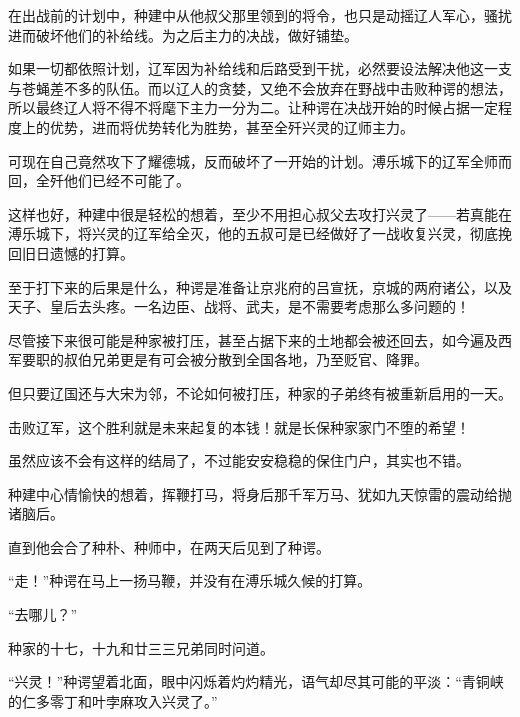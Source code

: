 在出战前的计划中，种建中从他叔父那里领到的将令，也只是动摇辽人军心，骚扰进而破坏他们的补给线。为之后主力的决战，做好铺垫。

如果一切都依照计划，辽军因为补给线和后路受到干扰，必然要设法解决他这一支与苍蝇差不多的队伍。而以辽人的贪婪，又绝不会放弃在野战中击败种谔的想法，所以最终辽人将不得不将麾下主力一分为二。让种谔在决战开始的时候占据一定程度上的优势，进而将优势转化为胜势，甚至全歼兴灵的辽师主力。

可现在自己竟然攻下了耀德城，反而破坏了一开始的计划。溥乐城下的辽军全师而回，全歼他们已经不可能了。

这样也好，种建中很是轻松的想着，至少不用担心叔父去攻打兴灵了——若真能在溥乐城下，将兴灵的辽军给全灭，他的五叔可是已经做好了一战收复兴灵，彻底挽回旧日遗憾的打算。

至于打下来的后果是什么，种谔是准备让京兆府的吕宣抚，京城的两府诸公，以及天子、皇后去头疼。一名边臣、战将、武夫，是不需要考虑那么多问题的！

尽管接下来很可能是种家被打压，甚至占据下来的土地都会被还回去，如今遍及西军要职的叔伯兄弟更是有可会被分散到全国各地，乃至贬官、降罪。

但只要辽国还与大宋为邻，不论如何被打压，种家的子弟终有被重新启用的一天。

击败辽军，这个胜利就是未来起复的本钱！就是长保种家家门不堕的希望！

虽然应该不会有这样的结局了，不过能安安稳稳的保住门户，其实也不错。

种建中心情愉快的想着，挥鞭打马，将身后那千军万马、犹如九天惊雷的震动给抛诸脑后。

直到他会合了种朴、种师中，在两天后见到了种谔。

“走！”种谔在马上一扬马鞭，并没有在溥乐城久候的打算。

“去哪儿？”

种家的十七，十九和廿三三兄弟同时问道。

“兴灵！”种谔望着北面，眼中闪烁着灼灼精光，语气却尽其可能的平淡：“青铜峡的仁多零丁和叶孛麻攻入兴灵了。”

